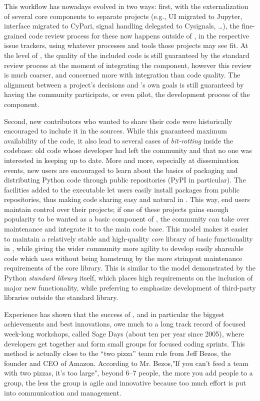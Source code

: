 \documentclass{deliverablereport}
\begin{document}
This workflow has nowadays evolved in two ways: first, with the
externalization of several core components to separate projects (e.g.,
UI migrated to Jupyter, \PariGP interface migrated to CyPari, signal
handling delegated to Cysignals, \dots), the fine-grained code review
process for these now happens outside of \Sage, in the respective
issue trackers, using whatever processes and tools those projects may see
fit. %
At the level of \Sage, the quality of the included code is still
guaranteed by the standard review process at the moment of integrating
the component, however this review is much coarser, and concerned more
with integration than code quality. %
The alignment between a project's decisions and \Sage's own goals is
still guaranteed by having the \Sage community participate, or even
pilot, the development process of the component.

Second, new \Sage contributors who wanted to share their code were
historically encouraged to include it in the \Sage sources. %
While this guaranteed maximum availability of the code, it also lead
to several cases of \emph{bit-rotting} inside the \Sage codebase: old
code whose developer had left the community and that no one was
interested in keeping up to date. %
More and more, especially at \ODK dissemination events, new users are
encouraged to learn about the basics of packaging and distributing
Python code through public repositories (PyPI in particular). %
The facilities added to the \Sage executable let users easily install
packages from public repositories, thus making code sharing easy and
natural in \Sage. %
This way, end users maintain control over their \Sage projects; if one
of these projects gains enough popularity to be wanted as a basic
component of \Sage, the community can take over maintenance and
integrate it to the main code base.  This model makes it easier to
maintain a relatively stable and high-quality \emph{core} library of
basic functionality in \Sage, while giving the wider community more
agility to develop easily shareable code which \emph{uses} \Sage
without being hamstrung by the more stringent maintenance requirements
of the core library.  This is similar to the model demonstrated by the
Python \emph{standard library} itself, which places high requirements
on the inclusion of major new functionality, while preferring to
emphasize development of third-party libraries outside the standard
library. %

Experience has shown that the success of \Sage, and in particular the
biggest achievements and best innovations, owe much to a long track record of
focused week-long workshops, called Sage Days (about ten per year
since 2005), where developers get together and form small groups for
focused coding sprints. This method is actually close to the ``two pizza''
team rule from Jeff Bezos, the founder and CEO of Amazon. According
to Mr. Bezos,"If you can't feed a team with two pizzas, it's too large",
beyond 6--7 people, the more you add people to a group,
the less the group is agile and innovative because too much effort is
put into communication and management.
\end{document}
